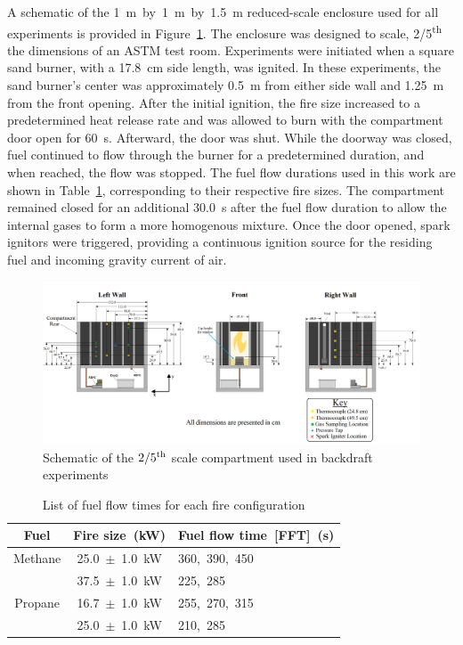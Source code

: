 \documentclass[12pt,letterpaper]{article}
\begin{document}
\begin{flushleft}
A schematic of the 1~m~by~1~m~by~1.5~m reduced-scale enclosure used for all experiments is provided in Figure~\ref{fig:Backdraft_experimental_setup}. The enclosure was designed to scale, 2/5\textsuperscript{th} the dimensions of an ASTM test room. Experiments were initiated when a square sand burner, with a 17.8~cm side length, was ignited. In these experiments, the sand burner's center was approximately 0.5~m from either side wall and 1.25~m from the front opening. After the initial ignition, the fire size increased to a predetermined heat release rate and was allowed to burn with the compartment door open for 60~s. Afterward, the door was shut. While the doorway was closed, fuel continued to flow through the burner for a predetermined duration, and when reached, the flow was stopped. The fuel flow durations used in this work are shown in Table~\ref{tab:Fuel_Flow_Time}, corresponding to their respective fire sizes. The compartment remained closed for an additional 30.0~s after the fuel flow duration to allow the internal gases to form a more homogenous mixture. Once the door opened, spark ignitors were triggered, providing a continuous ignition source for the residing fuel and incoming gravity current of air.
\begin{figure}[!]
	\centering
\includegraphics[width=16.0cm, keepaspectratio]{Experimental_Setup_6.png}
	\caption{Schematic of the $2/5^{\rm{th}}$ scale compartment used in backdraft experiments}
	\label{fig:Backdraft_experimental_setup}
\end{figure}

\begin{table}[h!]
\caption{List of fuel flow times for each fire configuration}
\label{tab:Fuel_Flow_Time}
\centering
	\footnotesize
	\begin{tabular}{c c l}
\hline
Fuel & Fire size~(kW)	& Fuel flow time~[FFT]~(s)  \\
\hline
Methane & 25.0~$\pm$~1.0~kW 	& 360,~390,~450\\
	& 37.5~$\pm$~1.0~kW 	& 225,~285      \\
Propane & 16.7~$\pm$~1.0~kW		& 255,~270,~315	\\
	& 25.0~$\pm$~1.0~kW 	& 210,~285		 \\
\hline
\end{tabular}
\end{table}


\end{flushleft}
\end{document}
